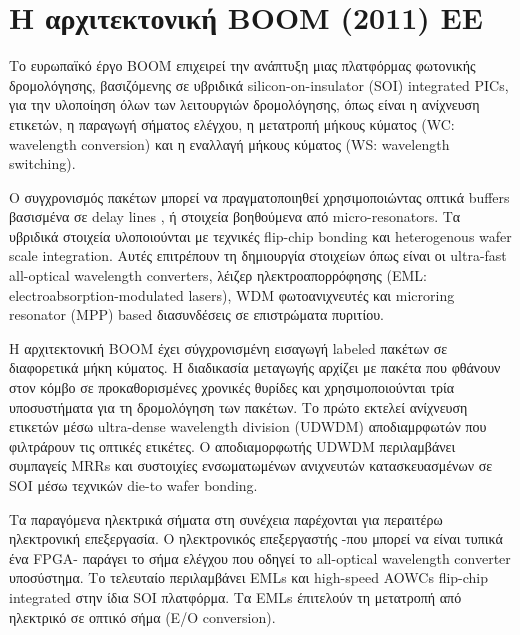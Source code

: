 \section{Η αρχιτεκτονική BOOM (2011) ΕΕ}



Tο ευρωπαϊκό έργο BOOM επιχειρεί την ανάπτυξη μιας πλατφόρμας
φωτονικής δρομολόγησης, βασιζόμενης σε υβριδικά silicon-on-insulator
(SOI) integrated PICs, για την υλοποίηση όλων των λειτουργιών
δρομολόγησης, όπως είναι η ανίχνευση ετικετών, η παραγωγή σήματος
ελέγχου, η μετατροπή μήκους κύματος (WC: wavelength conversion) και η
εναλλαγή μήκους κύματος (WS: wavelength switching).

Ο συγχρονισμός πακέτων μπορεί να πραγματοποιηθεί χρησιμοποιώντας
οπτικά buffers βασισμένα σε delay lines \cite{5685653}, ή στοιχεία
βοηθούμενα από micro-resonators. Τα υβριδικά στοιχεία υλοποιούνται με
τεχνικές flip-chip bonding και heterogenous wafer scale integration.
Αυτές επιτρέπουν τη δημιουργία στοιχείων όπως είναι οι ultra-fast
all-optical wavelength converters, λέιζερ ηλεκτροαπορρόφησης (EML:
electroabsorption-modulated lasers), WDM φωτοανιχνευτές και microring
resonator (ΜΡΡ) based διασυνδέσεις σε επιστρώματα πυριτίου.

H αρχιτεκτονική BOOM έχει σύγχρονισμένη εισαγωγή labeled πακέτων σε
διαφορετικά μήκη κύματος. Η διαδικασία μεταγωγής αρχίζει με πακέτα που
φθάνουν στον κόμβο σε προκαθορισμένες χρονικές θυρίδες και
χρησιμοποιούνται τρία υποσυστήματα για τη δρομολόγηση των πακέτων.  Το
πρώτο εκτελεί ανίχνευση ετικετών μέσω ultra-dense wavelength division
(UDWDM) αποδιαμρφωτών που φιλτράρουν τις οπτικές ετικέτες. Ο
αποδιαμορφωτής UDWDM περιλαμβάνει συμπαγείς MRRs και συστοιχίες
ενσωματωμένων ανιχνευτών κατασκευασμένων σε SOI μέσω τεχνικών die-to
wafer bonding.

Τα παραγόμενα ηλεκτρικά σήματα στη συνέχεια παρέχονται για περαιτέρω
ηλεκτρονική επεξεργασία.  Ο ηλεκτρονικός επεξεργαστής -που μπορεί να
είναι τυπικά ένα FPGA- παράγει το σήμα ελέγχου που οδηγεί το
all-optical wavelength converter υποσύστημα. Το τελευταίο περιλαμβάνει
EMLs και high-speed AOWCs flip-chip integrated στην ίδια SOI
πλατφόρμα. Τα EMLs έπιτελούν τη μετατροπή από ηλεκτρικό σε οπτικό σήμα
(E/O conversion).

